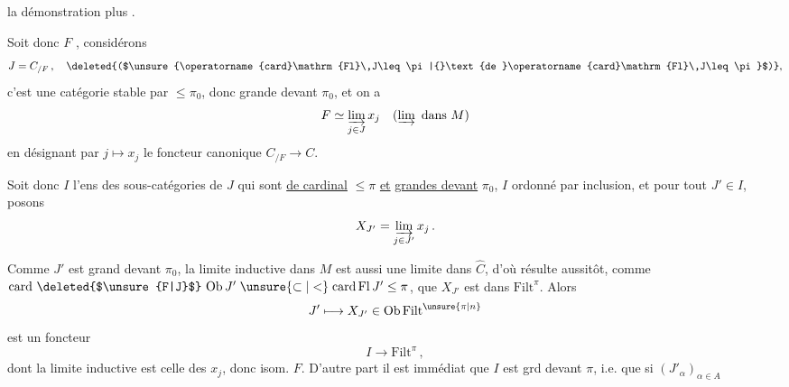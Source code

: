 la démonstration plus .

Soit donc $F$  ,  considérons
\[ J=C_{/F}\,,\quad \text{\deleted{($\unsure{\operatorname{card}\mathrm{Fl}\,J\leq\pi|{}\text{de }\operatorname{card}\mathrm{Fl}\,J\leq\pi}$)}}, \]
c'est une catégorie stable par   $\leq\pi_0$, donc grande devant $\pi_0$, et on a
\[ F\simeq\varinjlim_{j\in J}x_j\quad(\varinjlim\text{ dans }M) \]
en désignant par $j\longmapsto x_j$ le foncteur canonique $C_{/F}\longrightarrow C$.

Soit donc $I$ l'ens des sous-catégories  de $J$ qui sont \uline{de cardinal} $\leq\pi$ \uline{et} \uline{grandes devant} $\pi_0$, $I$ ordonné par inclusion, et pour tout $J'\in I$, posons
\[ X_{J'}=\varinjlim_{j\in J'}x_j\,. \]
  

Comme $J'$ est grand devant $\pi_0$, la limite inductive dans $M$ est aussi une limite dans $\widehat C$, d'où résulte  aussitôt, comme $\operatorname{card}\,\text{\deleted{$\unsure{F|J}$}}\,\operatorname{Ob} J'\mathrel{\unsure{\subset|<}}\operatorname{card}\mathrm{Fl}\,J'\leq\pi$, que $X_{J'}$ est dans $\mathrm{Filt}^\pi$. Alors
\[ J'\longmapsto X_{J'}\in\operatorname{Ob}\mathrm{Filt}^{\unsure{\pi|n}} \]
est un foncteur
\[ I\longrightarrow\mathrm{Filt}^\pi\,, \]
dont la limite inductive est celle des $x_j$, donc isom.  $F$. D'autre part il est immédiat que $I$ est grd devant $\pi$, i.e. que si $(J'_\alpha)_{\alpha\in A}$ 
